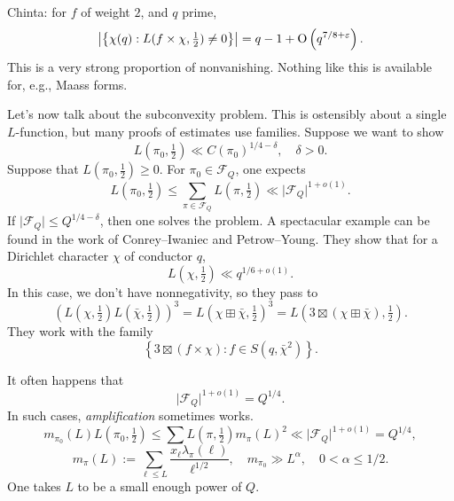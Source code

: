 \documentclass[reqno]{amsart} 
\begin{document}
Chinta: for $f$ of weight $2$, and $q$ prime,
\begin{equation*}
  \left\lvert \left\{ \chi(q) : L(f \times \chi, \tfrac{1}{2} ) \neq 0 \right\} \right\rvert
  = q - 1 + \operatorname{O} \left( q^{7/8 + \varepsilon} \right).
\end{equation*}
This is a very strong proportion of nonvanishing.  Nothing like this is available for, e.g., Maass forms.

Let's now talk about the subconvexity problem.  This is ostensibly about a single $L$-function, but many proofs of estimates use families.  Suppose we want to show
\begin{equation*}
L(\pi_0, \tfrac{1}{2}  ) \ll C(\pi_0 )^{1/4 - \delta}, \quad \delta > 0.
\end{equation*}
Suppose that $L(\pi_0, \tfrac{1}{2} ) \geq 0$.  For $\pi_0 \in \mathcal{F}_Q$, one expects
\begin{equation*}
  L(\pi_0, \tfrac{1}{2} ) \leq \sum_{\pi \in \mathcal{F}_Q} L(\pi, \tfrac{1}{2} )
\ll \lvert \mathcal{F}_Q  \rvert^{1 + o (1)}.  
\end{equation*}
If $\lvert \mathcal{F}_Q \rvert \leq Q^{1/4 - \delta}$, then one solves the problem.  A spectacular example can be found in the work of Conrey--Iwaniec and Petrow--Young.  They show that for a Dirichlet character $\chi$ of conductor $q$,
\begin{equation*}
L(\chi, \tfrac{1}{2} ) \ll q^{1/6 + o(1)}.
\end{equation*}
In this case, we don't have nonnegativity, so they pass to
\begin{equation*}
  {\left( L(\chi, \tfrac{1}{2} ) L(\bar{\chi}, \tfrac{1}{2} ) \right)}^3
  =
  {L(\chi \boxplus \bar{\chi}, \tfrac{1}{2} )}^3
  = L\left(3 \boxtimes \left( \chi \boxplus \bar{\chi} \right), \tfrac{1}{2} \right).
\end{equation*}
They work with the family
\begin{equation*}
\left\{ 3 \boxtimes(f \times \chi ) : f \in S(q, \bar{\chi}^2) \right\}.
\end{equation*}

It often happens that
\begin{equation*}
\lvert \mathcal{F}_Q  \rvert^{1 + o(1)} = Q^{1/4}.
\end{equation*}
In such cases, \emph{amplification} sometimes works.
\begin{equation*}
  m_{\pi_0}(L) L(\pi_0, \tfrac{1}{2}) \leq \sum L(\pi, \tfrac{1}{2}) m_\pi(L)^2
  \ll \lvert \mathcal{F}_Q  \rvert^{1 + o(1)} = Q^{1/4},
\end{equation*}
\begin{equation*}
  m_\pi(L) := \sum_{\ell \leq L}
  \frac{x_{\ell} \lambda_\pi(\ell)}{\ell^{1/2}},
  \quad
  m_{\pi_0 } \gg L^\alpha , \quad 0 < \alpha \leq 1/2.
\end{equation*}
One takes $L$ to be a small enough power of $Q$.
\end{document}
